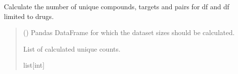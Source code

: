 \documentclass[letterpaper,10pt,english]{sphinxmanual}
\begin{document}

\begin{fulllineitems}
\label{\detokenize{get_stats:get_stats.calculate_dataset_sizes}}
\pysigstartsignatures
{}
\pysigstopsignatures
\sphinxAtStartPar
Calculate the number of unique compounds, targets and pairs
for df and df limited to drugs.
\begin{quote}\begin{description}
\sphinxAtStartPar
{} () \textendash{} Pandas DataFrame for which the dataset sizes should be calculated.

\sphinxAtStartPar
List of calculated unique counts.

\sphinxAtStartPar
list{[}int{]}

\end{description}\end{quote}

\end{fulllineitems}

\end{document}
